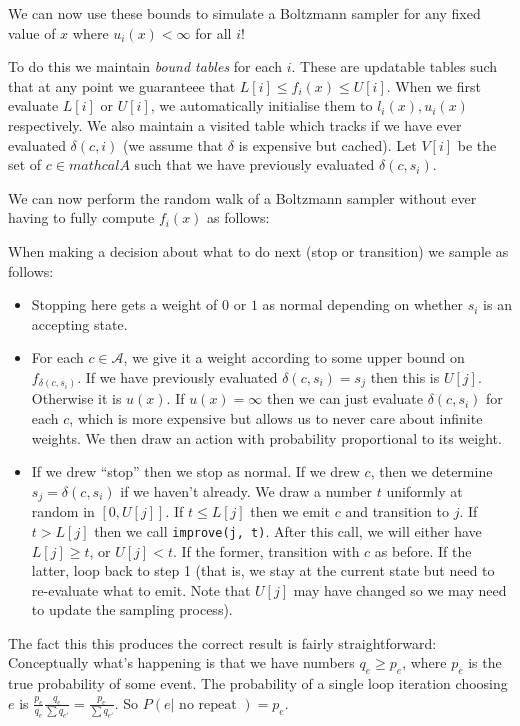 We can now use these bounds to simulate a Boltzmann sampler for any fixed value of \(x\) where \(u_i(x) < \infty\) for all \(i\)!

To do this we maintain \emph{bound tables} for each \(i\).
These are updatable tables such that at any point we guaranteee that \(L[i] \leq f_i(x) \leq U[i]\).
When we first evaluate \(L[i]\) or \(U[i]\),
we automatically initialise them to \(l_i(x), u_i(x)\) respectively.
We also maintain a visited table which tracks if we have ever evaluated \(\delta(c, i)\) (we assume that \(\delta\) is expensive but cached).
Let \(V[i]\) be the set of \(c \in mathcal{A}\) such that we have previously evaluated \(\delta(c, s_i)\).

We can now perform the random walk of a Boltzmann sampler without ever having to fully compute \(f_i(x)\) as follows:

When making a decision about what to do next (stop or transition) we sample as follows:

\begin{itemize}
\item Stopping here gets a weight of \(0\) or \(1\) as normal depending on whether \(s_i\) is an accepting state.
\item For each \(c \in \mathcal{A}\), we give it a weight according to some upper bound on \(f_{\delta(c, s_i)}\).
If we have previously evaluated \(\delta(c, s_i) = s_j\) then this is \(U[j]\).
Otherwise it is \(u(x)\).
If \(u(x) = \infty\) then we can just evaluate \(\delta(c, s_i)\) for each \(c\),
which is more expensive but allows us to never care about infinite weights.
We then draw an action with probability proportional to its weight.
\item If we drew ``stop'' then we stop as normal.
If we drew \(c\), then we determine \(s_j = \delta(c, s_i)\) if we haven't already.
We draw a number \(t\) uniformly at random in \([0, U[j]]\).
If \(t \leq L[j]\) then we emit \(c\) and transition to \(j\).
If \(t > L[j]\) then we call \texttt{improve(j, t)}.
After this call,
we will either have \(L[j] \geq t\),
or \(U[j] < t\).
If the former, transition with \(c\) as before.
If the latter, loop back to step 1 (that is, we stay at the current state but need to re-evaluate what to emit. Note that \(U[j]\) may have changed so we may need to update the sampling process).
\end{itemize}

The fact this this produces the correct result is fairly straightforward:
Conceptually what's happening is that we have numbers \(q_e \geq p_e\),
where \(p_e\) is the true probability of some event.
The probability of a single loop iteration choosing \(e\) is \(\frac{p_e}{q_e} \frac{q_e}{\sum q_{e'}} = \frac{p_e}{\sum q_{e'}}\).
So \(P(e| \text{ no repeat }) = p_e\).

